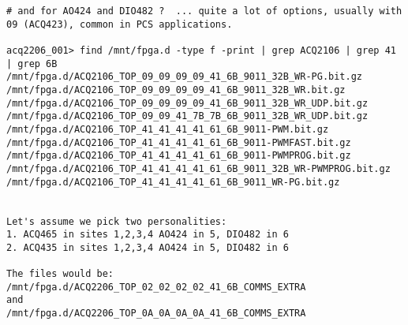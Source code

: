 \documentclass[]{article}
\begin{document}
\begin{lstlisting}[style=bashstyle,frame=single]
# and for AO424 and DIO482 ?  ... quite a lot of options, usually with 09 (ACQ423), common in PCS applications.

acq2206_001> find /mnt/fpga.d -type f -print | grep ACQ2106 | grep 41 | grep 6B
/mnt/fpga.d/ACQ2106_TOP_09_09_09_09_41_6B_9011_32B_WR-PG.bit.gz
/mnt/fpga.d/ACQ2106_TOP_09_09_09_09_41_6B_9011_32B_WR.bit.gz
/mnt/fpga.d/ACQ2106_TOP_09_09_09_09_41_6B_9011_32B_WR_UDP.bit.gz
/mnt/fpga.d/ACQ2106_TOP_09_09_41_7B_7B_6B_9011_32B_WR_UDP.bit.gz
/mnt/fpga.d/ACQ2106_TOP_41_41_41_41_61_6B_9011-PWM.bit.gz
/mnt/fpga.d/ACQ2106_TOP_41_41_41_41_61_6B_9011-PWMFAST.bit.gz
/mnt/fpga.d/ACQ2106_TOP_41_41_41_41_61_6B_9011-PWMPROG.bit.gz
/mnt/fpga.d/ACQ2106_TOP_41_41_41_41_61_6B_9011_32B_WR-PWMPROG.bit.gz
/mnt/fpga.d/ACQ2106_TOP_41_41_41_41_61_6B_9011_WR-PG.bit.gz


Let's assume we pick two personalities:
1. ACQ465 in sites 1,2,3,4 AO424 in 5, DIO482 in 6
2. ACQ435 in sites 1,2,3,4 AO424 in 5, DIO482 in 6

The files would be:
/mnt/fpga.d/ACQ2206_TOP_02_02_02_02_41_6B_COMMS_EXTRA
and
/mnt/fpga.d/ACQ2206_TOP_0A_0A_0A_0A_41_6B_COMMS_EXTRA
\end{lstlisting}

%
\end{document}
